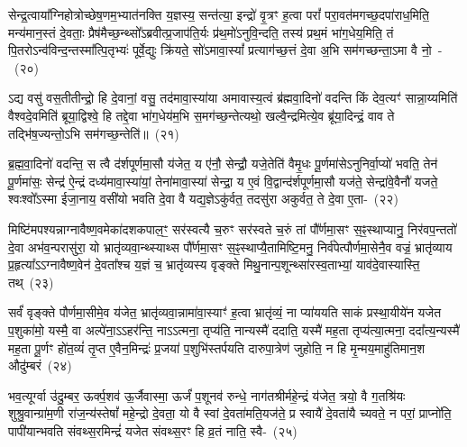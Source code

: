 सेन्द्र॒त्वाया᳚ग्निहोत्रोच्छेष॒णम॒भ्यात॑नक्ति य॒ज्ञस्य॒ सन्त॑त्या॒ इन्द्रो॑ वृ॒त्रꣳ ह॒त्वा परां᳚ परा॒वत॑मगच्छ॒दपा॑राध॒मिति॒ मन्य॑मान॒स्तं दे॒वताः॒ प्रैष॑मैच्छ॒न्थ्सो᳚\-ऽब्रवीत्प्र॒जा\-प॑ति॒र्यः प्र॑थ॒मो॑\-ऽनुवि॒न्दति॒ तस्य॑ प्रथ॒मं भा॑ग॒धेय॒मिति॒ तं पि॒तरो\-ऽन्व॑विन्द॒न्तस्मा᳚त्पि॒तृभ्यः॑ पूर्वे॒द्युः क्रि॑यते॒ सो॑\-ऽमावा॒स्यां᳚ प्रत्याग॑च्छ॒त्तं दे॒वा अ॒भि सम॑गच्छन्ता॒ऽमा वै नो॒~-~(२०)

ऽद्य वसु॑ वस॒तीतीन्द्रो॒ हि दे॒वानां॒ वसु॒ तद॑मावा॒स्या॑या अमावास्य॒त्वं ब्र॑ह्मवा॒दिनो॑ वदन्ति किं देव॒त्यꣳ॑ सान्ना॒य्यमिति॑ वैश्वदे॒वमिति॑ ब्रूया॒द्विश्वे॒ हि तद्दे॒वा भा॑ग॒धेय॑म॒भि स॒मग॑च्छ॒न्तेत्यथो॒ खल्वै॒न्द्रमित्ये॒व ब्रू॑या॒दिन्द्रं॒ वाव ते तद्भि॑ष॒ज्यन्तो॒\-ऽभि सम॑गच्छ॒न्तेति॑॥~(२१)

{}%

ब्र॒ह्म॒वा॒दिनो॑ वदन्ति॒ स त्वै द॑र्शपूर्णमा॒सौ य॑जेत॒ य ए॑नौ॒ सेन्द्रौ॒ यजे॒तेति॑ वैमृ॒धः पू॒र्णमा॑से\-ऽनुनिर्वा॒प्यो॑ भवति॒ तेन॑ पू॒र्णमा॑सः॒ सेन्द्र॑ ऐ॒न्द्रं दध्य॑मावा॒स्या॑यां॒ तेना॑मावा॒स्या॑ सेन्द्रा॒ य ए॒वं वि॒द्वान्द॑र्शपूर्णमा॒सौ यज॑ते॒ सेन्द्रा॑वे॒वैनौ॑ यजते॒ श्वःश्वो᳚\-ऽस्मा ईजा॒नाय॒ वसी॑यो भवति दे॒वा वै यद्य॒ज्ञे\-ऽकु॑र्वत॒ तदसु॑रा अकुर्वत॒ ते दे॒वा ए॒ता-~(२२)

मिष्टि॑मपश्यन्नाग्नावैष्ण॒वमेका॑\-दश\-कपाल॒ꣳ॒ सर॑स्वत्यै च॒रुꣳ सर॑स्वते च॒रुं तां पौ᳚र्णमा॒सꣳ स॒ꣴ॒स्थाप्यानु॒ निर॑वप॒न्ततो॑ दे॒वा अभ॑व॒न्परासु॑रा॒ यो भ्रातृ॑व्यवा॒न्थ्स्याथ्स पौ᳚र्णमा॒सꣳ स॒ꣴ॒स्थाप्यै॒तामिष्टि॒मनु॒ निर्व॑पेत्पौर्णमा॒सेनै॒व वज्रं॒ भ्रातृ॑व्याय प्र॒हृत्या᳚ऽऽग्नावैष्ण॒वेन॑ दे॒वता᳚श्च य॒ज्ञं च॒ भ्रातृ॑व्यस्य वृङ्क्ते मिथु॒नान्प॒शून्थ्सा॑\-रस्व॒ताभ्यां॒ याव॑दे॒वास्यास्ति॒ तथ्~(२३)

सर्वं॑ वृङ्क्ते पौर्णमा॒सीमे॒व य॑जेत॒ भ्रातृ॑व्यवा॒न्नामा॑वा॒स्याꣳ॑ ह॒त्वा भ्रातृ॑व्यं॒ ना प्या॑ययति साकं प्रस्था॒यीये॑न यजेत प॒शुका॑मो॒ यस्मै॒ वा अल्पे॑ना॒ऽऽहर॑न्ति॒ नाऽऽत्मना॒ तृप्य॑ति॒ नान्यस्मै॑ ददाति॒ यस्मै॑ मह॒ता तृप्य॑त्या॒त्मना॒ ददा᳚त्य॒न्यस्मै॑ मह॒ता पू॒र्णꣳ हो॑त॒व्यं॑ तृ॒प्त ए॒वैन॒मिन्द्रः॑ प्र॒जया॑ प॒शुभि॑स्तर्पयति दारुपा॒त्रेण॑ जुहोति॒ न हि मृ॒न्मय॒माहु॑तिमान॒श औदु॑म्बरं~(२४)

भव॒त्यूर्ग्वा उ॑दु॒म्बर॒ ऊर्क्प॒शव॑ ऊ॒र्जैवास्मा॒ ऊर्जं॑ प॒शूनव॑ रुन्धे॒ नाग॑तश्रीर्महे॒न्द्रं य॑जेत॒ त्रयो॒ वै ग॒तश्रि॑यः शुश्रु॒वान्ग्रा॑म॒णी रा॑ज॒न्य॑स्तेषां᳚ महे॒न्द्रो दे॒वता॒ यो वै स्वां दे॒वता॑मति॒यज॑ते॒ प्र स्वायै॑ दे॒वता॑यै च्यवते॒ न परां॒ प्राप्नो॑ति॒ पापी॑यान्भवति संवथ्स॒रमिन्द्रं॑ यजेत संवथ्स॒रꣳ हि व्र॒तं नाति॒ स्वै-~(२५)

